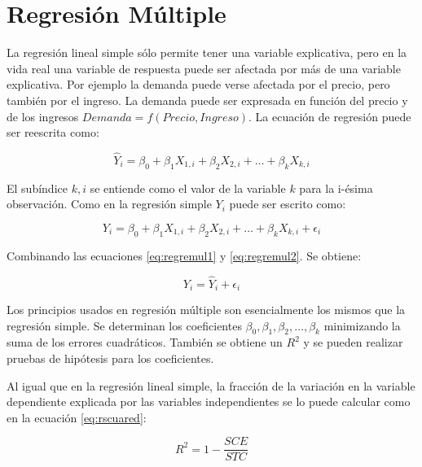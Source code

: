 \documentclass[
]{krantz}
\begin{document}
\hypertarget{mult}{%
\section{Regresión Múltiple}\label{mult}}

La regresión lineal simple sólo permite tener una variable explicativa, pero en la vida real una variable de respuesta puede ser afectada por más de una variable explicativa. Por ejemplo la demanda puede verse afectada por el precio, pero también por el ingreso. La demanda puede ser expresada en función del precio y de los ingresos \(Demanda=f\left(Precio,Ingreso\right)\). La ecuación de regresión puede ser reescrita como:

\begin{equation}
\hat{Y}_i = \beta_0 + \beta_1 X_{1,i} + \beta_2 X_{2,i}  + \ldots + \beta_k X_{k,i}
    \label{eq:regremul1}
\end{equation}

El subíndice \(k,i\) se entiende como el valor de la variable \(k\) para la i-ésima observación. Como en la regresión simple \(Y_i\) puede ser escrito como:

\begin{equation}
Y_i = \beta_0 + \beta_1 X_{1,i} + \beta_2 X_{2,i}  + \ldots + \beta_k X_{k,i} + \epsilon_i
    \label{eq:regremul2}
\end{equation}

Combinando las ecuaciones \eqref{eq:regremul1} y \eqref{eq:regremul2}. Se obtiene:

\begin{equation}
Y_i = \hat{Y}_i + \epsilon_i
    \label{eq:regremul3}
\end{equation}

Los principios usados en regresión múltiple son esencialmente los mismos que la regresión simple. Se determinan los coeficientes \(\beta_0,\beta_1,\beta_2,\ldots,\beta_k\) minimizando la suma de los errores cuadráticos. También se obtiene un \(R^2\) y se pueden realizar pruebas de hipótesis para los coeficientes.

Al igual que en la regresión lineal simple, la fracción de la variación en la variable dependiente explicada por las variables independientes se lo puede calcular como en la ecuación \eqref{eq:rscuared}:

\begin{equation}
R^2 = 1 - \dfrac{SCE}{STC}
    \label{eq:rscuared2}
\end{equation}
\end{document}
